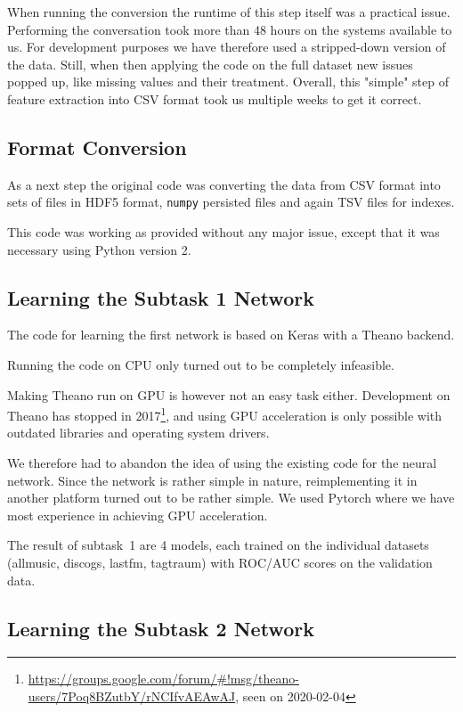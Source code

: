 \documentclass[sigconf,nonacm]{acmart}
\begin{document}
When running the conversion the runtime of this step itself was
a practical issue.
Performing the conversation took more than 48 hours on the systems
available to us.
For development purposes we have therefore used a stripped-down
version of the data.
Still, when then applying the code on the full dataset new
issues popped up, like missing values and their treatment.
Overall, this "simple" step of feature extraction into CSV
format took us multiple weeks to get it correct.

\subsection{Format Conversion}

As a next step the original code was converting the data from
CSV format into sets of files in HDF5 format, \texttt{numpy}
persisted files and again TSV files for indexes.

This code was working as provided without any major issue,
except that it was necessary using Python version 2.

\subsection{Learning the Subtask 1 Network}

The code for learning the first network is based on Keras
with a Theano backend.

Running the code on CPU only turned out to be completely infeasible.

Making Theano run on GPU is however not an easy task either.
Development on Theano has stopped in 
2017\footnote{\url{https://groups.google.com/forum/\#!msg/theano-users/7Poq8BZutbY/rNCIfvAEAwAJ}, seen on 2020-02-04},
and using GPU acceleration
is only possible with outdated libraries and operating system drivers.

We therefore had to abandon the idea of using the existing code
for the neural network.
Since the network is rather simple in nature, reimplementing
it in another platform turned out to be rather simple.
We used Pytorch where we have most experience
in achieving GPU acceleration.

The result of subtask~1 are 4 models, each trained on the individual
datasets (allmusic, discogs, lastfm, tagtraum) with ROC/AUC scores
on the validation data.

\subsection{Learning the Subtask 2 Network}
\end{document}
